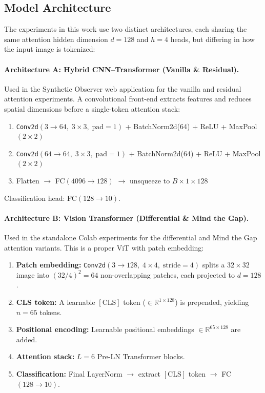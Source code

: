 \documentclass[12pt, a4paper]{article}
\begin{document}
\subsection{Model Architecture}

The experiments in this work use two distinct architectures, each sharing
the same attention hidden dimension $d = 128$ and $h = 4$ heads, but
differing in how the input image is tokenized:

\paragraph{Architecture A: Hybrid CNN--Transformer (Vanilla \& Residual).}
Used in the Synthetic Observer web application for the vanilla and
residual attention experiments. A convolutional front-end extracts
features and reduces spatial dimensions before a single-token attention
stack:
\begin{enumerate}[label=\arabic*.]
    \item \texttt{Conv2d}$(3 \to 64,\; 3\times 3,\; \text{pad}=1)$ +
          BatchNorm2d(64) + ReLU + MaxPool$(2\times 2)$
    \item \texttt{Conv2d}$(64 \to 64,\; 3\times 3,\; \text{pad}=1)$ +
          BatchNorm2d(64) + ReLU + MaxPool$(2\times 2)$
    \item Flatten $\to$ FC$(4096 \to 128)$ $\to$ unsqueeze to
          $B \times 1 \times 128$
\end{enumerate}
Classification head: FC$(128 \to 10)$.

\paragraph{Architecture B: Vision Transformer (Differential \& Mind the Gap).}
Used in the standalone Colab experiments for the differential and
Mind the Gap attention variants. This is a proper ViT with patch
embedding:
\begin{enumerate}[label=\arabic*.]
    \item \textbf{Patch embedding:}
          \texttt{Conv2d}$(3 \to 128,\; 4\times 4,\;
          \text{stride}=4)$ splits a $32 \times 32$ image into
          $(32/4)^2 = 64$ non-overlapping patches, each projected to
          $d = 128$.
    \item \textbf{CLS token:} A learnable $[\text{CLS}]$ token
          ($\in \mathbb{R}^{1 \times 128}$) is prepended, yielding
          $n = 65$ tokens.
    \item \textbf{Positional encoding:} Learnable positional embeddings
          $\in \mathbb{R}^{65 \times 128}$ are added.
    \item \textbf{Attention stack:} $L = 6$ Pre-LN Transformer blocks.
    \item \textbf{Classification:} Final LayerNorm $\to$ extract
          $[\text{CLS}]$ token $\to$ FC$(128 \to 10)$.
\end{enumerate}
\end{document}
